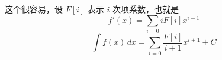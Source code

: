 这个很容易，设 $F[i]$ 表示 $i$ 次项系数，也就是
\[
f'(x) = \sum_{i = 0} iF[i]x^{i - 1}
\]
\[
\int f(x)\,dx = \sum_{i = 0} \frac{F[i]}{i + 1}x^{i + 1} + C
\]